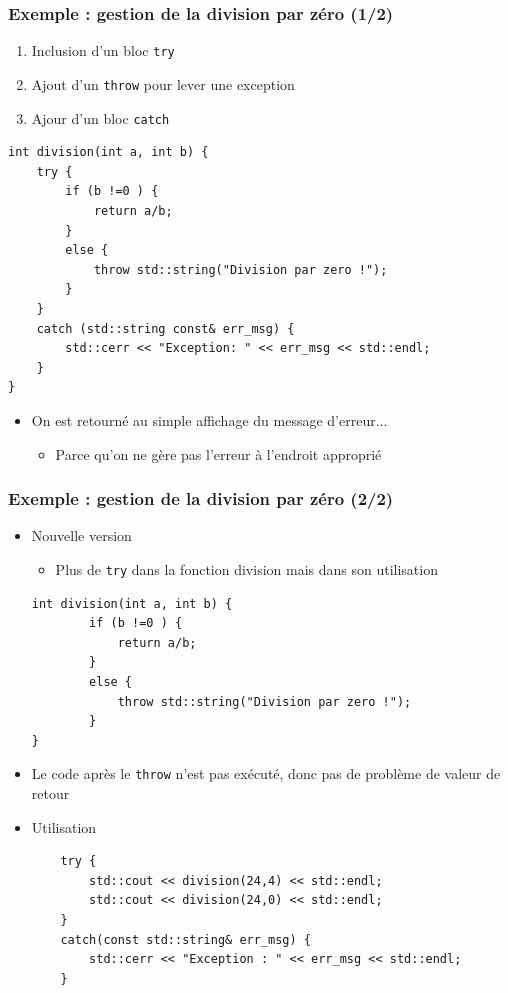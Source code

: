 \begin{frame}[fragile]
\frametitle{Exemple : gestion de la division par zéro (1/2)}
\begin{enumerate}
\item Inclusion d'un bloc \verb|try|
\item Ajout d'un \verb|throw| pour lever une exception
\item Ajour d'un bloc \verb|catch|
\end{enumerate}
\begin{lstlisting}
int division(int a, int b) {
    try {
        if (b !=0 ) {
            return a/b;
        }
        else {
            throw std::string("Division par zero !");
        }
    }
    catch (std::string const& err_msg) {
        std::cerr << "Exception: " << err_msg << std::endl;
    }
}
\end{lstlisting}
\begin{itemize}
\item On est retourné au simple affichage du message d'erreur...
\begin{itemize}
\item Parce qu'on ne gère pas l'erreur à l'endroit approprié
\end{itemize}
\end{itemize}
\end{frame}

\begin{frame}[fragile]
\frametitle{Exemple : gestion de la division par zéro (2/2)}
\begin{itemize}
\item Nouvelle version 
\begin{itemize}
\item Plus de \verb|try| dans la fonction division mais dans son utilisation
\end{itemize}
\begin{lstlisting}
int division(int a, int b) {
        if (b !=0 ) {
            return a/b;
        }
        else {
            throw std::string("Division par zero !");
        }
}
\end{lstlisting}
\item Le code après le \verb|throw| n'est pas exécuté, donc pas de problème de valeur de retour
\item Utilisation
\begin{lstlisting}
    try {
        std::cout << division(24,4) << std::endl;
        std::cout << division(24,0) << std::endl;
    }
    catch(const std::string& err_msg) {
        std::cerr << "Exception : " << err_msg << std::endl;
    }
\end{lstlisting}
\end{itemize}
\end{frame}

